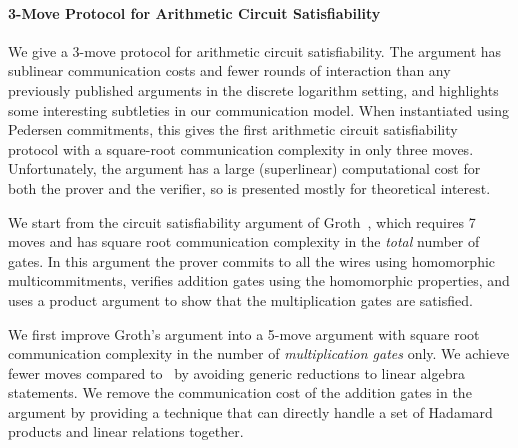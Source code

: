 \paragraph{3-Move Protocol for Arithmetic Circuit Satisfiability}

We give a 3-move protocol for arithmetic circuit satisfiability. The argument has sublinear communication costs and fewer rounds of interaction than any previously published arguments in the discrete logarithm setting, and highlights some interesting subtleties in our communication model. When instantiated using Pedersen commitments, this gives the first arithmetic circuit satisfiability protocol with a square-root communication complexity in only three moves. Unfortunately, the argument has a large (superlinear) computational cost for both the prover and the verifier, so is presented mostly for theoretical interest.


We start from the circuit satisfiability argument of Groth~\cite{Groth2009b}, which requires 7 moves and has square root communication complexity in the \emph{total} number of gates. In this argument the prover commits to all the wires using homomorphic multicommitments, verifies addition gates using the homomorphic properties, and uses a product argument to show that the multiplication gates are satisfied.

We first improve Groth's argument into a 5-move argument with square root communication complexity in the number of \emph{multiplication gates} only.
%
We achieve fewer moves compared to~\cite{Groth2009b} by avoiding generic reductions to linear algebra statements.
%
We remove the communication cost of the addition gates in the argument by providing a technique that can directly handle a set of Hadamard products and linear relations together.

